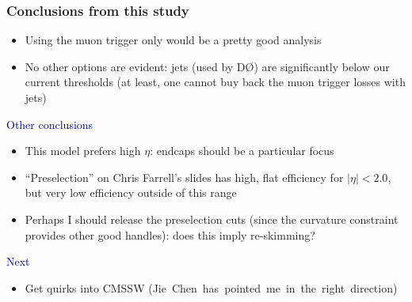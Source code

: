 \documentclass[compress]{beamer}
\begin{document}
\begin{frame}
\frametitle{Conclusions from this study}
\begin{itemize}
\item Using the muon trigger only would be a pretty good analysis
\item No other options are evident: jets (used by D\O) are significantly below our current thresholds (at least, one cannot buy back the muon trigger losses with jets)
\end{itemize}

\vspace{0.2 cm}
\hspace{-0.83 cm} \textcolor{darkblue}{\Large Other conclusions}

\vspace{0.1 cm}
\begin{itemize}
\item This model prefers high $\eta$: endcaps should be a particular focus
\item ``Preselection'' on Chris Farrell's slides has high, flat efficiency for $|\eta| < 2.0$, but very low efficiency outside of this range
\item Perhaps I should release the preselection cuts (since the curvature constraint provides other good handles): does this imply re-skimming?
\end{itemize}

\vspace{0.2 cm}
\hspace{-0.83 cm} \textcolor{darkblue}{\Large Next}

\vspace{0.1 cm}
\begin{itemize}
\item Get quirks into CMSSW \mbox{(Jie Chen has pointed me in the right direction)\hspace{-1 cm}}
\end{itemize}

\label{numpages}
\end{frame}
\end{document}
